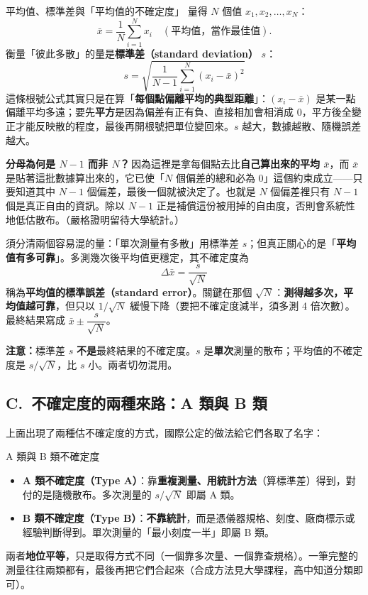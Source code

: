 \documentclass[11pt]{article}
\begin{document}
\begin{補充框}{平均值、標準差與「平均值的不確定度」}
量得 $N$ 個值 $x_1, x_2, \dots, x_N$：
$$\bar{x} = \frac{1}{N}\sum_{i=1}^{N} x_i \quad(\text{平均值，當作最佳值}).$$
衡量「彼此多散」的量是\textbf{標準差（standard deviation）} $s$：
$$\boxed{\ s = \sqrt{\dfrac{1}{N-1}\sum_{i=1}^{N}(x_i-\bar{x})^2}\ }$$
這條根號公式其實只是在算「\textbf{每個點偏離平均的典型距離}」：$(x_i-\bar{x})$ 是某一點偏離平均多遠；要先\textbf{平方}是因為偏差有正有負、直接相加會相消成 0，平方後全變正才能反映散的程度，最後再開根號把單位變回來。$s$ 越大，數據越散、隨機誤差越大。

\textbf{分母為何是 $N-1$ 而非 $N$？}\,因為這裡是拿每個點去比\textbf{自己算出來的平均 $\bar{x}$}，而 $\bar{x}$ 是貼著這批數據算出來的，它已使「$N$ 個偏差的總和必為 0」這個約束成立——只要知道其中 $N-1$ 個偏差，最後一個就被決定了。也就是 $N$ 個偏差裡只有 $N-1$ 個是真正自由的資訊。除以 $N-1$ 正是補償這份被用掉的自由度，否則會系統性地低估散布。（嚴格證明留待大學統計。）

\medskip
須分清兩個容易混的量：「單次測量有多散」用標準差 $s$；但真正關心的是「\textbf{平均值有多可靠}」。多測幾次後平均值更穩定，其不確定度為
$$\boxed{\ \Delta\bar{x} = \frac{s}{\sqrt{N}}\ }$$
稱為\textbf{平均值的標準誤差（standard error）}。關鍵在那個 $\sqrt{N}$：\textbf{測得越多次，平均值越可靠}，但只以 $1/\sqrt{N}$ 緩慢下降（要把不確定度減半，須多測 4 倍次數）。最終結果寫成 $\bar{x}\pm\dfrac{s}{\sqrt{N}}$。
\end{補充框}

\textbf{注意：}標準差 $s$ \textbf{不是}最終結果的不確定度。$s$ 是\textbf{單次}測量的散布；平均值的不確定度是 $s/\sqrt{N}$，比 $s$ 小。兩者切勿混用。

\subsection*{\sffamily C.\ 不確定度的兩種來路：A 類與 B 類}

上面出現了兩種估不確定度的方式，國際公定的做法給它們各取了名字：

\begin{補充框}{A 類與 B 類不確定度}
\begin{itemize}\setlength{\itemsep}{2pt}
\item \textbf{A 類不確定度（Type A）}：靠\textbf{重複測量、用統計方法}（算標準差）得到，對付的是隨機散布。多次測量的 $s/\sqrt{N}$ 即屬 A 類。
\item \textbf{B 類不確定度（Type B）}：\textbf{不靠統計}，而是憑儀器規格、刻度、廠商標示或經驗判斷得到。單次測量的「最小刻度一半」即屬 B 類。
\end{itemize}
兩者\textbf{地位平等}，只是取得方式不同（一個靠多次量、一個靠查規格）。一筆完整的測量往往兩類都有，最後再把它們合起來（合成方法見大學課程，高中知道分類即可）。
\end{補充框}
\end{document}
